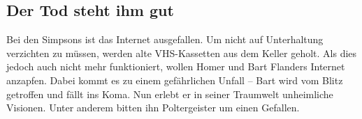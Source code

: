 
\subsection{Der Tod steht ihm gut}\label{XABF14}
Bei den Simpsons ist das Internet ausgefallen. Um nicht auf Unterhaltung verzichten zu müssen, werden alte VHS-Kassetten aus dem Keller geholt. Als dies jedoch auch nicht mehr funktioniert, wollen Homer und Bart Flanders Internet anzapfen. Dabei kommt es zu einem gefährlichen Unfall -- Bart wird vom Blitz getroffen und fällt ins Koma. Nun erlebt er in seiner Traumwelt unheimliche Visionen. Unter anderem bitten ihn Poltergeister um einen Gefallen.

